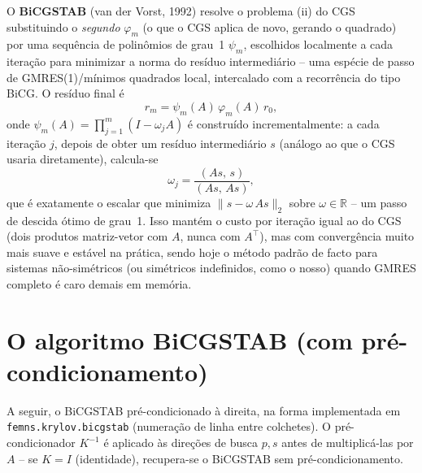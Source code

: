 \documentclass[11pt,a4paper]{article}
\newcommand{\R}{\mathbb{R}}
\begin{document}
O \textbf{BiCGSTAB} (van der Vorst, 1992) resolve o problema (ii) do
CGS substituindo o \emph{segundo} $\varphi_m$ (o que o CGS aplica de
novo, gerando o quadrado) por uma sequência de polinômios de grau~1
$\psi_m$, escolhidos localmente a cada iteração para minimizar a norma
do resíduo intermediário -- uma espécie de passo de GMRES(1)/mínimos
quadrados local, intercalado com a recorrência do tipo BiCG. O
resíduo final é
\begin{equation}
  r_m = \psi_m(A)\,\varphi_m(A)\,r_0,
\end{equation}
onde $\psi_m(A) = \prod_{j=1}^m (I - \omega_j A)$ é construído
incrementalmente: a cada iteração $j$, depois de obter um resíduo
intermediário $s$ (análogo ao que o CGS usaria diretamente), calcula-se
\begin{equation}
  \label{eq:omega}
  \omega_j = \frac{(As,\,s)}{(As,\,As)},
\end{equation}
que é exatamente o escalar que minimiza $\|s - \omega\, As\|_2$ sobre
$\omega\in\R$ -- um passo de descida ótimo de grau~1. Isso mantém o
custo por iteração igual ao do CGS (dois produtos matriz-vetor com
$A$, nunca com $A^\top$), mas com convergência muito mais suave e
estável na prática, sendo hoje o método padrão de facto para sistemas
não-simétricos (ou simétricos indefinidos, como o nosso) quando GMRES
completo é caro demais em memória.

\section{O algoritmo BiCGSTAB (com pré-condicionamento)}
\label{sec:algoritmo}

A seguir, o BiCGSTAB pré-condicionado à direita, na forma implementada
em \texttt{femns.krylov.bicgstab} (numeração de linha entre
colchetes). O pré-condicionador $K^{-1}$ é aplicado às direções de
busca $p,s$ antes de multiplicá-las por $A$ -- se $K=I$ (identidade),
recupera-se o BiCGSTAB sem pré-condicionamento.
\end{document}
